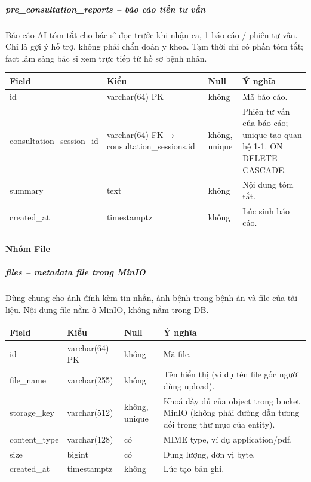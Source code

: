 \subparagraph{pre\_consultation\_reports -- báo cáo tiền tư vấn}

Báo cáo AI tóm tắt cho bác sĩ đọc trước khi nhận ca, 1 báo cáo / phiên tư vấn. Chỉ là gợi ý hỗ trợ, không phải chẩn đoán y khoa. Tạm thời chỉ có phần tóm tắt; fact lâm sàng bác sĩ xem trực tiếp từ hồ sơ bệnh nhân.
\begin{longtable}{|>{\raggedright\arraybackslash}p{0.250\dimexpr\linewidth-8\tabcolsep\relax}|>{\raggedright\arraybackslash}p{0.250\dimexpr\linewidth-8\tabcolsep\relax}|>{\raggedright\arraybackslash}p{0.250\dimexpr\linewidth-8\tabcolsep\relax}|>{\raggedright\arraybackslash}p{0.250\dimexpr\linewidth-8\tabcolsep\relax}|}
\hline
\textbf{Field} & \textbf{Kiểu} & \textbf{Null} & \textbf{Ý nghĩa} \\ \hline
\endhead
id & varchar(64) PK & không & Mã báo cáo. \\ \hline
consultation\_session\_id & varchar(64) FK → consultation\_sessions.id & không, unique & Phiên tư vấn của báo cáo; unique tạo quan hệ 1-1. ON DELETE CASCADE. \\ \hline
summary & text & không & Nội dung tóm tắt. \\ \hline
created\_at & timestamptz & không & Lúc sinh báo cáo. \\ \hline
\end{longtable}

\paragraph{Nhóm File}

\subparagraph{files -- metadata file trong MinIO}

Dùng chung cho ảnh đính kèm tin nhắn, ảnh bệnh trong bệnh án và file của tài liệu. Nội dung file nằm ở MinIO, không nằm trong DB.
\begin{longtable}{|>{\raggedright\arraybackslash}p{0.250\dimexpr\linewidth-8\tabcolsep\relax}|>{\raggedright\arraybackslash}p{0.250\dimexpr\linewidth-8\tabcolsep\relax}|>{\raggedright\arraybackslash}p{0.250\dimexpr\linewidth-8\tabcolsep\relax}|>{\raggedright\arraybackslash}p{0.250\dimexpr\linewidth-8\tabcolsep\relax}|}
\hline
\textbf{Field} & \textbf{Kiểu} & \textbf{Null} & \textbf{Ý nghĩa} \\ \hline
\endhead
id & varchar(64) PK & không & Mã file. \\ \hline
file\_name & varchar(255) & không & Tên hiển thị (ví dụ tên file gốc người dùng upload). \\ \hline
storage\_key & varchar(512) & không, unique & Khoá đầy đủ của object trong bucket MinIO (không phải đường dẫn tương đối trong thư mục của entity). \\ \hline
content\_type & varchar(128) & có & MIME type, ví dụ application/pdf. \\ \hline
size & bigint & có & Dung lượng, đơn vị byte. \\ \hline
created\_at & timestamptz & không & Lúc tạo bản ghi. \\ \hline
\end{longtable}

